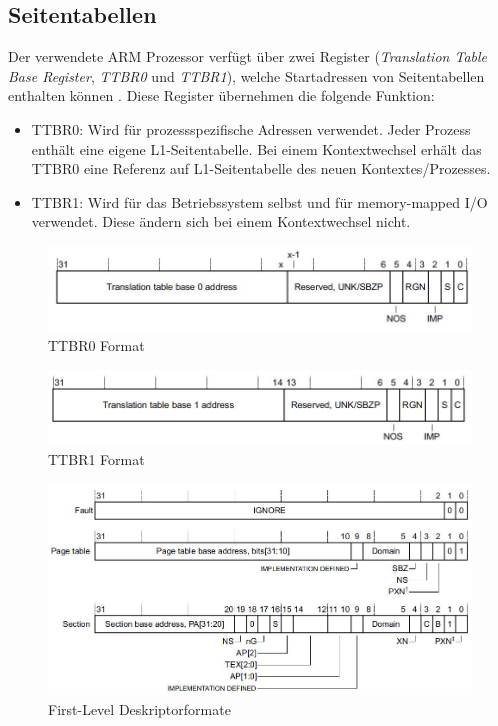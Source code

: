 \subsection*{Seitentabellen}

Der verwendete ARM Prozessor verfügt über zwei Register (\emph{Translation Table Base Register}, \emph{TTBR0} und \emph{TTBR1}), welche Startadressen von Seitentabellen enthalten können \cite[S. B3-1320]{ARM:ARM}. Diese Register übernehmen die folgende Funktion:

\begin{itemize}
	\item TTBR0: Wird für prozessspezifische Adressen verwendet. Jeder Prozess enthält eine eigene L1-Seitentabelle. Bei einem Kontextwechsel erhält das TTBR0 eine Referenz auf L1-Seitentabelle des neuen Kontextes/Prozesses.
	\item TTBR1: Wird für das Betriebssystem selbst und für memory-mapped I/O verwendet. Diese ändern sich bei einem Kontextwechsel nicht.
\end{itemize}


\begin{figure}[H]
	\includegraphics[scale=0.8]{figures/ttbr0format}
	\caption{TTBR0 Format \cite[S. B4-1726]{ARM:ARM}}
	\label{fig:TTBR0Format}
\end{figure}


\begin{figure}[H]
	\includegraphics[scale=0.8]{figures/ttbr1format}
	\caption{TTBR1 Format \cite[S. B4-1730]{ARM:ARM}}
	\label{fig:TTBR1Format}
\end{figure}

\begin{figure}[H]
	\includegraphics[scale=0.7]{figures/firstLevelDescriptor}
	\caption{First-Level Deskriptorformate \cite[S. B3-1326]{ARM:ARM}}
	\label{fig:firstLevelDescriptor}
\end{figure}

